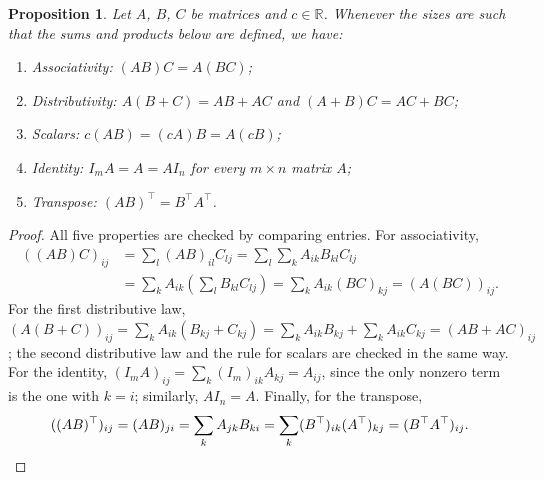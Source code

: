 \documentclass[11pt]{article}
\theoremstyle{definition}
\theoremstyle{plain}
\newtheorem{proposition}[definition]{Proposition}
\theoremstyle{remark}
\begin{document}
\begin{proposition}\label{prop:mult-props}
    Let $A$, $B$, $C$ be matrices and $c \in \mathbb{R}$. Whenever the sizes are such that the sums and products below are defined, we have:
    \begin{enumerate}
        \item Associativity: $(AB)C = A(BC)$;
        \item Distributivity: $A(B + C) = AB + AC$ and $(A + B)C = AC + BC$;
        \item Scalars: $c(AB) = (cA)B = A(cB)$;
        \item Identity: $I_m A = A = A I_n$ for every $m \times n$ matrix $A$;
        \item Transpose: $(AB)^\top = B^\top A^\top$.
    \end{enumerate}
\end{proposition}

\begin{proof}
    All five properties are checked by comparing entries. For associativity,
    \begin{align*}
        ((AB)C)_{ij} &= \sum_{l} (AB)_{il} C_{lj} = \sum_{l} \sum_{k} A_{ik} B_{kl} C_{lj} \\
        &= \sum_{k} A_{ik} \left(\sum_{l} B_{kl} C_{lj}\right) = \sum_{k} A_{ik} (BC)_{kj} = (A(BC))_{ij}.
    \end{align*}
    For the first distributive law, $(A(B + C))_{ij} = \sum_k A_{ik}(B_{kj} + C_{kj}) = \sum_k A_{ik} B_{kj} + \sum_k A_{ik} C_{kj} = (AB + AC)_{ij}$; the second distributive law and the rule for scalars are checked in the same way. For the identity, $(I_m A)_{ij} = \sum_k (I_m)_{ik} A_{kj} = A_{ij}$, since the only nonzero term is the one with $k = i$; similarly, $A I_n = A$. Finally, for the transpose,
    \[((AB)^\top)_{ij} = (AB)_{ji} = \sum_k A_{jk} B_{ki} = \sum_k (B^\top)_{ik} (A^\top)_{kj} = (B^\top A^\top)_{ij}. \qedhere\]
\end{proof}
\end{document}
